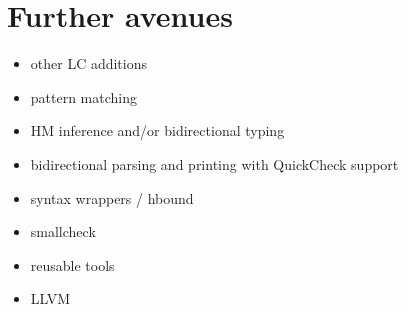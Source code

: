 \documentclass{beamer}
\begin{document}
\section{Further avenues}
\begin{itemize}
\item other LC additions
\item pattern matching
\item HM inference and/or bidirectional typing
\item bidirectional parsing and printing with QuickCheck support
\item syntax wrappers / hbound
\item smallcheck
\item reusable tools 
\item LLVM
\end{itemize}
\end{document}
